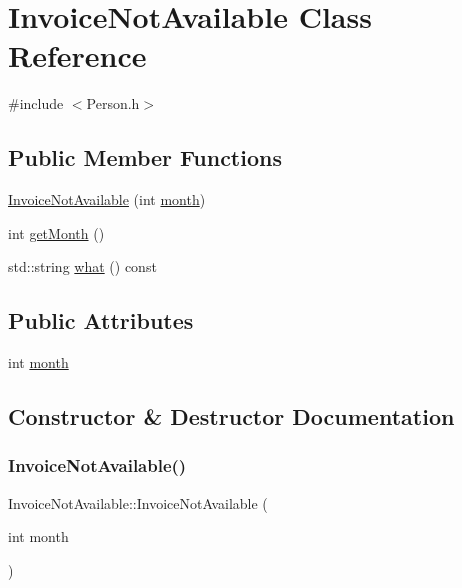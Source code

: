 \hypertarget{class_invoice_not_available}{}\section{Invoice\+Not\+Available Class Reference}
\label{class_invoice_not_available}


{\ttfamily \#include $<$Person.\+h$>$}

\subsection*{Public Member Functions}
\begin{DoxyCompactItemize}
\item 
\mbox{\hyperlink{class_invoice_not_available_ad8821a4be3e8d48aef9dcd971cc9e0d0}{Invoice\+Not\+Available}} (int \mbox{\hyperlink{class_invoice_not_available_a35029f0aa54b16c927f45adbac81f427}{month}})
\item 
int \mbox{\hyperlink{class_invoice_not_available_aba76622dae4202950c43956f6ed0930e}{get\+Month}} ()
\item 
std\+::string \mbox{\hyperlink{class_invoice_not_available_a77e49a07e8605a37f1a4c6c59742b898}{what}} () const
\end{DoxyCompactItemize}
\subsection*{Public Attributes}
\begin{DoxyCompactItemize}
\item 
int \mbox{\hyperlink{class_invoice_not_available_a35029f0aa54b16c927f45adbac81f427}{month}}
\end{DoxyCompactItemize}


\subsection{Constructor \& Destructor Documentation}
\mbox{\label{class_invoice_not_available_ad8821a4be3e8d48aef9dcd971cc9e0d0}} 
\subsubsection{\texorpdfstring{Invoice\+Not\+Available()}{InvoiceNotAvailable()}}
{\footnotesize\ttfamily Invoice\+Not\+Available\+::\+Invoice\+Not\+Available (\begin{DoxyParamCaption}\item[{int}]{month }\end{DoxyParamCaption})\hspace{0.3cm}{\ttfamily [inline]}}



